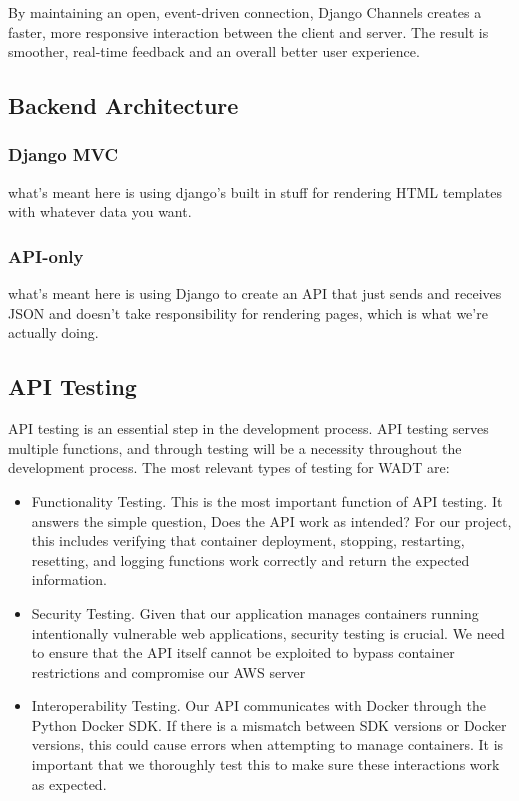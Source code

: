 \documentclass[12pt]{article}
\begin{document}
By maintaining an open, event-driven connection, Django Channels creates a faster,
more responsive interaction between the client and server.
The result is smoother, real-time feedback and an overall better user experience.

\subsection{Backend Architecture}

\subsubsection{Django MVC}
what's meant here is using django's built in stuff for rendering HTML templates with whatever data you want.

\subsubsection{API-only}
what's meant here is using Django to create an API that just sends and receives JSON and doesn't take responsibility for rendering pages, which is what we're actually doing.


\subsection{API Testing}

API testing is an essential step in the development process. API testing serves multiple functions, and through testing will be a necessity throughout the development process. The most relevant types of testing for WADT are:
\begin{itemize}
\item Functionality Testing. This is the most important function of API testing. It answers the simple question, Does the API work as intended? For our project, this includes verifying that container deployment, stopping, restarting, resetting, and logging functions work correctly and return the expected information. 
\item Security Testing. Given that our application manages containers running intentionally vulnerable web applications, security testing is crucial. We need to ensure that the API itself cannot be exploited to bypass container restrictions and compromise our AWS server
\item Interoperability Testing. Our API communicates with Docker through the Python Docker SDK. If there is a mismatch between SDK versions or Docker versions, this could cause errors when attempting to manage containers. It is important that we thoroughly test this to make sure these interactions work as expected.
\end{itemize}
\end{document}

